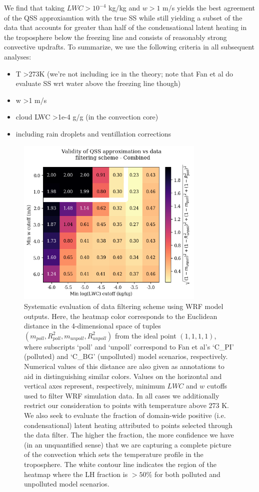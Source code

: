 \documentclass{article}
\begin{document}
We find that taking $LWC > 10^{-4}$ kg/kg and $w>1$ m/s yields the best agreement of the QSS approxiamtion with the true SS while still yielding a subset of the data that accounts for greater than half of the condensational latent heating in the troposphere below the freezing line and consists of reasonably strong convective updrafts. To summarize, we use the following criteria in all subsequent analyses:
\begin{itemize}
	\item T \textgreater  273K (we're not including ice in the theory; note that Fan et al do evaluate SS wrt water above the freezing line though)
	\item w \textgreater  1 m/s
	\item cloud LWC \textgreater  1e-4 g/g (in the convection core) 
	\item including rain droplets and ventillation corrections
\end{itemize}

\begin{figure}[ht]
    \centering
    \includegraphics[width=9cm]{wrf/filtering_criteria_figure.png}
    \caption{Systematic evaluation of data filtering scheme using WRF model outputs. Here, the heatmap color corresponds to the Euclidean distance in the 4-dimensional space of tuples $(m_{poll}, R^2_{poll}, m_{unpoll}, R^2_{unpoll})$ from the ideal point $(1, 1, 1, 1)$, where subscripts `poll' and `unpoll' correspond to Fan et al's `C\_PI' (polluted) and `C\_BG' (unpolluted) model scenarios, respectively. Numerical values of this distance are also given as annotations to aid in distinguishing similar colors. Values on the horizontal and vertical axes represent, respectively, minimum $LWC$ and $w$ cutoffs used to filter WRF simulation data. In all cases we additionally restrict our consideration to points with temperature above 273 K. We also seek to evaluate the fraction of domain-wide positive (i.e. condensational) latent heating attributed to points selected through the data filter. The higher the fraction, the more confidence we have (in an unquantified sense) that we are capturing a complete picture of the convection which sets the temperature profile in the troposphere. The white contour line indicates the region of the heatmap where the LH fraction is $> 50\%$ for both polluted and unpolluted model scenarios.}
    \label{filtcritheatmap}
\end{figure}
\end{document}
